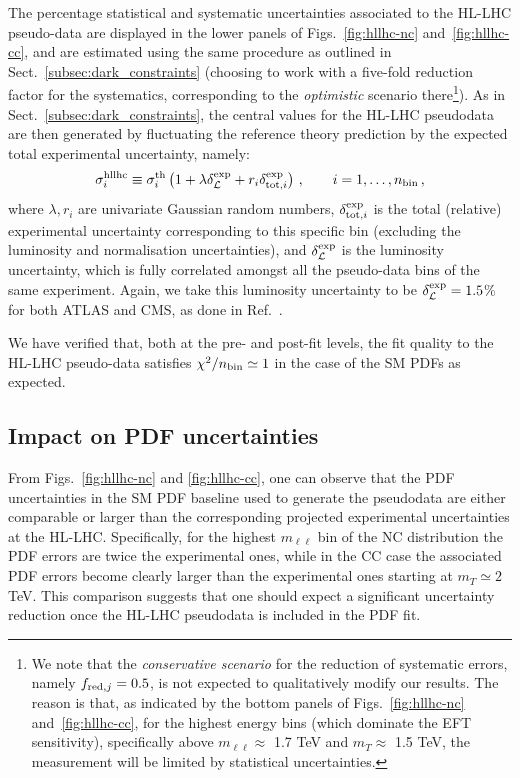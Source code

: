 \documentclass[withindex,glossary]{cam-thesis}
\begin{document}
The percentage statistical and systematic uncertainties associated to the HL-LHC pseudo-data
are displayed in the lower panels of Figs.~\ref{fig:hllhc-nc} and~\ref{fig:hllhc-cc}, and are 
estimated using the same procedure as outlined in Sect.~\ref{subsec:dark_constraints} (choosing
to work with a five-fold reduction factor for the systematics, corresponding to the \textit{optimistic} 
scenario there\footnote{We note that the \textit{conservative scenario} for the reduction of systematic errors,
namely $f_{{\rm red},j}=0.5$, is not expected to qualitatively
modify our results.
%
The reason is that, as indicated by
the bottom panels of Figs.~\ref{fig:hllhc-nc} and~\ref{fig:hllhc-cc},
for the highest energy bins (which dominate
the EFT sensitivity), specifically above
$m_{\ell\ell}\approx$ 1.7 TeV and $m_T \approx$ 1.5 TeV, the measurement
will be limited by statistical uncertainties.}). As in Sect.~\ref{subsec:dark_constraints}, the central values for the HL-LHC pseudodata are then generated
by fluctuating the reference theory prediction by the expected total experimental
uncertainty, namely:
\begin{equation}
  \label{eq:hllhc}
\sigma^{\rm hllhc}_{i} \equiv \sigma^{\rm th}_{i} \left( 1+ \lambda
  \delta_{\cal L}^{\rm exp} +  r_i\delta_{{\rm tot},i}^{\rm exp}   \right) \, , \qquad i=1,\ldots,n_{\rm bin} \, ,
\end{equation}
where $\lambda,r_i$ are univariate Gaussian random numbers, $\delta_{{\rm tot},i}^{\rm exp}$
is the total (relative) experimental uncertainty corresponding to this
specific bin
(excluding the luminosity and normalisation uncertainties), and $\delta_{\cal L}^{\rm exp}$
is the luminosity uncertainty, which is fully correlated amongst all
the pseudo-data bins of the same experiment. Again, we take this luminosity uncertainty to be
$\delta_{\cal L}^{\rm exp}=1.5$\%  for both ATLAS and CMS, as done in Ref.~\cite{Khalek:2018mdn}.

We have verified that, both at the pre- and post-fit levels, the fit quality to the HL-LHC pseudo-data
satisfies $\chi^2/n_{\rm bin} \simeq 1$ in the case of the SM PDFs
as expected.


\subsection{Impact on PDF uncertainties}

From Figs.~\ref{fig:hllhc-nc} and \ref{fig:hllhc-cc},  one can observe that
the PDF uncertainties in the SM PDF baseline used to generate the pseudodata
are either comparable or larger than the corresponding
projected experimental uncertainties at the  HL-LHC.
%
Specifically, for the highest $m_{\ell\ell}$ bin
of the NC distribution the PDF errors are twice the experimental ones,
while in the CC case the associated PDF errors become clearly larger
than the experimental ones starting at $m_T\simeq 2 $ TeV.
%
This comparison suggests that one should expect a significant 
uncertainty reduction once the HL-LHC pseudodata is included
in the PDF fit.
\end{document}
